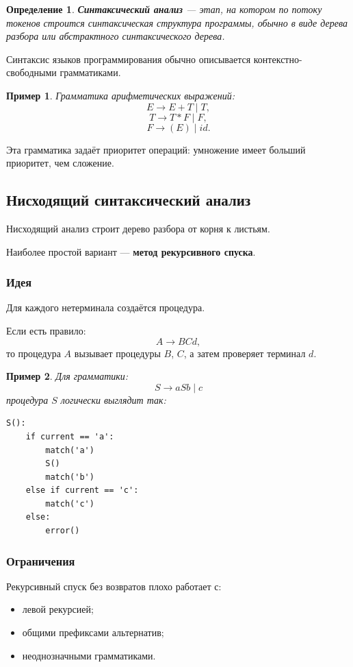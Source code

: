 \documentclass[12pt,a4paper]{article}
\newtheorem{definition}{Определение}
\newtheorem{example}{Пример}
\begin{document}
\begin{definition}
\textbf{Синтаксический анализ} --- этап, на котором по потоку токенов строится синтаксическая структура программы, обычно в виде дерева разбора или абстрактного синтаксического дерева.
\end{definition}

Синтаксис языков программирования обычно описывается контекстно-свободными грамматиками.

\begin{example}
Грамматика арифметических выражений:
\[
E\to E+T\mid T,
\]
\[
T\to T*F\mid F,
\]
\[
F\to (E)\mid id.
\]
\end{example}

Эта грамматика задаёт приоритет операций: умножение имеет больший приоритет, чем сложение.

\subsection{Нисходящий синтаксический анализ}

Нисходящий анализ строит дерево разбора от корня к листьям.

Наиболее простой вариант --- \textbf{метод рекурсивного спуска}.

\subsubsection*{Идея}

Для каждого нетерминала создаётся процедура.

Если есть правило:
\[
A\to BCd,
\]
то процедура $A$ вызывает процедуры $B$, $C$, а затем проверяет терминал $d$.

\begin{example}
Для грамматики:
\[
S\to aSb\mid c
\]
процедура $S$ логически выглядит так:
\begin{verbatim}
S():
    if current == 'a':
        match('a')
        S()
        match('b')
    else if current == 'c':
        match('c')
    else:
        error()
\end{verbatim}
\end{example}

\subsubsection*{Ограничения}

Рекурсивный спуск без возвратов плохо работает с:
\begin{itemize}
    \item левой рекурсией;
    \item общими префиксами альтернатив;
    \item неоднозначными грамматиками.
\end{itemize}
\end{document}
